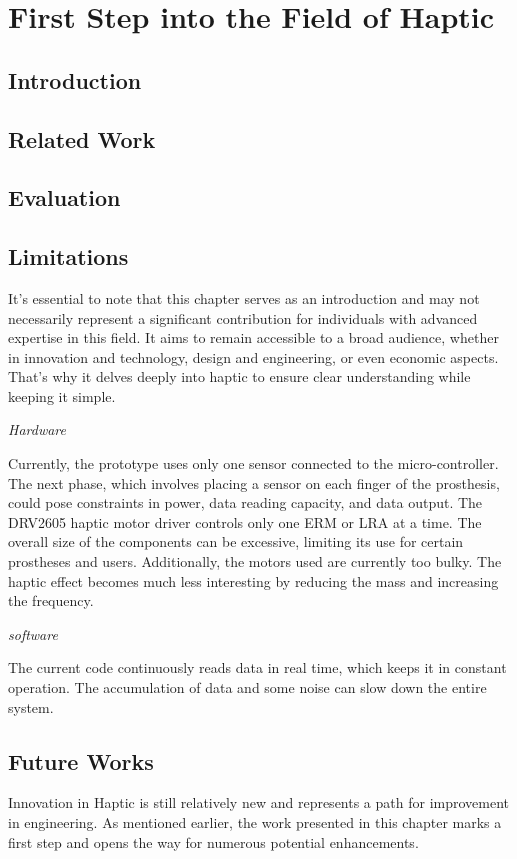 \chapter{First Step into the Field of Haptic}
\section{Introduction}

\section{Related Work}

\section{Evaluation}

\section{Limitations}
It’s essential to note that this chapter serves as an introduction and may not necessarily represent a significant contribution for individuals with advanced expertise in this field. It aims to remain accessible to a broad audience, whether in innovation and technology, design and engineering, or even economic aspects. That's why it delves deeply into haptic to ensure clear understanding while keeping it simple.

\textit{Hardware}

Currently, the prototype uses only one sensor connected to the micro-controller. The next phase, which involves placing a sensor on each finger of the prosthesis, could pose constraints in power, data reading capacity, and data output. The DRV2605 haptic motor driver controls only one ERM or LRA at a time. The overall size of the components can be excessive, limiting its use for certain prostheses and users. Additionally, the motors used are currently too bulky. The haptic effect becomes much less interesting by reducing the mass and increasing the frequency.

\textit{software}

The current code continuously reads data in real time, which keeps it in constant operation. The accumulation of data and some noise can slow down the entire system.

\section{Future Works}
Innovation in Haptic is still relatively new and represents a path for improvement in engineering. As mentioned earlier, the work presented in this chapter marks a first step and opens the way for numerous potential enhancements.

